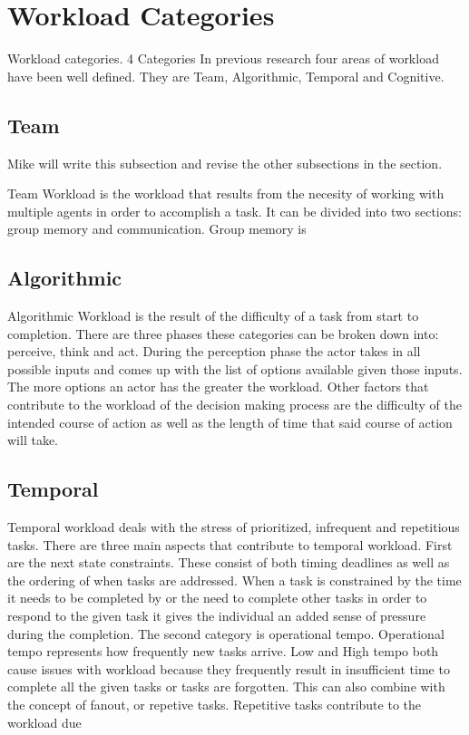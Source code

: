 \section{Workload Categories}

Workload categories.
4 Categories
	In previous research four areas of workload have been well defined. They are Team, Algorithmic, Temporal and Cognitive.
\subsection{Team}

{\sc Mike will write this subsection and revise the other subsections in the section.}

	Team Workload is the workload that results from the necesity of working with multiple agents in order to accomplish a task. It can be divided into two sections: group memory and communication. Group memory is 

\subsection{Algorithmic}
Algorithmic Workload is the result of the difficulty of a task from start to completion. There are three phases these categories can be broken down into: perceive, think and act. During the perception phase the actor takes in all possible inputs and comes up with the list of options available given those inputs. The more options an actor has the greater the workload. Other factors that contribute to the workload of the decision making process are the difficulty of the intended course of action as well as the length of time that said course of action will take.

\subsection{Temporal}
Temporal workload deals with the stress of prioritized, infrequent and repetitious tasks. There are three main aspects that contribute to temporal workload. First are the next state constraints. These consist of both timing deadlines as well as the ordering of when tasks are addressed. When a task is constrained by the time it needs to be completed by or the need to complete other tasks in order to respond to the given task it gives the individual an added sense of pressure during the completion. The second category is operational tempo. Operational tempo represents how frequently new tasks arrive. Low and High tempo both cause issues with workload because they frequently result in insufficient time to complete all the given tasks or tasks are forgotten. This can also combine with the concept of fanout, or repetive tasks. Repetitive tasks contribute to the workload due

